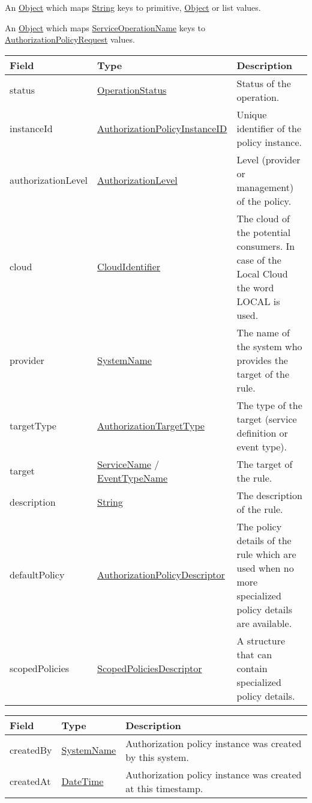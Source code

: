 \documentclass[a4paper]{arrowhead}
\newcommand{\pref}[1]{{\textcolor{ArrowheadGrey}{\hyperref[sec:model:primitives:#1]{#1}}}}
\begin{document}

An \pref{Object} which maps \pref{String} keys to primitive, \pref{Object} or list values.


An \pref{Object} which maps \pref{ServiceOperationName} keys to \hyperref[sec:model:AuthorizationPolicyRequest]{AuthorizationPolicyRequest} values.

 
\begin{table}[ht!]
\begin{tabularx}{\textwidth}{| p{4.25cm} | p{4.5cm} | X |} \hline
\rowcolor{gray!33} Field & Type      & Description \\ \hline
status & \pref{OperationStatus} & Status of the operation. \\ \hline
instanceId & \pref{AuthorizationPolicyInstanceID} & Unique identifier of the policy instance. \\ \hline
authorizationLevel & \pref{AuthorizationLevel} & Level (provider or management) of the policy. \\ \hline
cloud & \pref{CloudIdentifier} & The cloud of the potential consumers. In case of the Local Cloud the word LOCAL is used. \\ \hline
provider & \pref{SystemName} & The name of the system who provides the target of the rule. \\ \hline
targetType & \pref{AuthorizationTargetType} & The type of the target (service definition or event type). \\ \hline
target &  \pref{ServiceName} / \pref{EventTypeName} & The target of the rule. \\ \hline
description & \pref{String} & The description of the rule. \\ \hline
defaultPolicy & \hyperref[sec:model:AuthorizationPolicyDescriptor]{AuthorizationPolicyDescriptor} & The policy details of the rule which are used when no more specialized policy details are available. \\ \hline
scopedPolicies & \hyperref[sec:model:ScopedPoliciesDescriptor]{ScopedPoliciesDescriptor} & A structure that can contain specialized po\-licy details. \\ \hline
\end{tabularx}
\end{table}

\begin{table}[ht!]
\begin{tabularx}{\textwidth}{| p{4.25cm} | p{4.5cm} | X |} \hline
\rowcolor{gray!33} Field & Type      & Description \\ \hline
createdBy & \pref{SystemName} & Authorization policy instance was created by this system. \\ \hline
createdAt & \pref{DateTime} & Authorization policy instance was created at this timestamp. \\ \hline
\end{tabularx}
\end{table}
\end{document}
